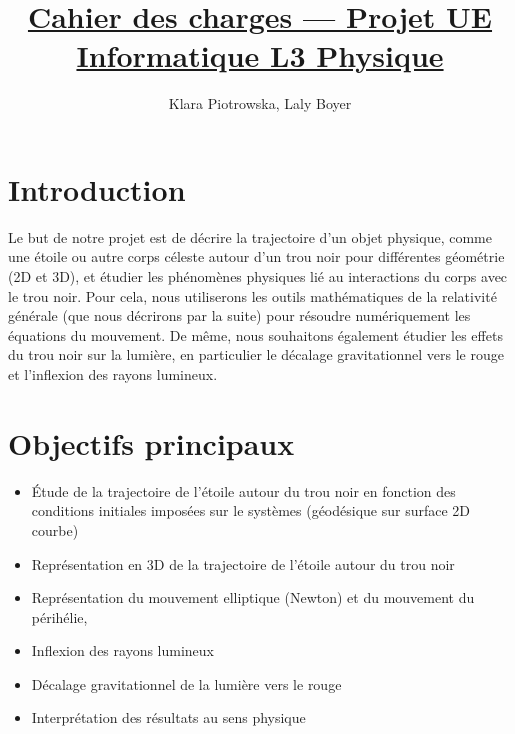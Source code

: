 \documentclass{article}
\title{\underline{Cahier des charges — Projet UE Informatique L3 Physique}\vspace{2em}
\tcbox[colframe=black,colback=white,boxrule=0.5mm]{\begin{minipage}{1\textwidth} %
\centering \textbf{\Large Relativité Générale - Étude du mouvement d'une étoile autour d'un trou noir de Schwarzschild}
\end{minipage}}}
\author{Klara Piotrowska, Laly Boyer}
\begin{document}
\maketitle
\tableofcontents

\newpage

\section{Introduction}


Le but de notre projet est de décrire la trajectoire d'un objet physique, comme une étoile ou autre corps céleste autour d’un trou noir pour différentes géométrie (2D et 3D), et étudier les phénomènes physiques lié au interactions du corps avec le trou noir. Pour cela, nous utiliserons les outils mathématiques de la relativité générale (que nous décrirons par la suite) pour résoudre numériquement les équations du mouvement. 
De même, nous souhaitons également étudier les effets du trou noir sur la lumière, en particulier le décalage gravitationnel vers le rouge et l’inflexion des rayons lumineux.


\section{Objectifs principaux} 
\begin{itemize}[label=\textendash]
    \item Étude de la trajectoire de l’étoile autour du trou noir en fonction des conditions initiales imposées sur le systèmes (géodésique sur surface 2D courbe)
    \item Représentation en 3D de la trajectoire de l’étoile autour du trou noir
    \item Représentation du mouvement elliptique (Newton) et du mouvement du périhélie, 
    \item Inflexion des rayons lumineux
    \item Décalage gravitationnel de la lumière vers le rouge 
    \item Interprétation  des résultats au sens physique
\end{itemize}
\end{document}
